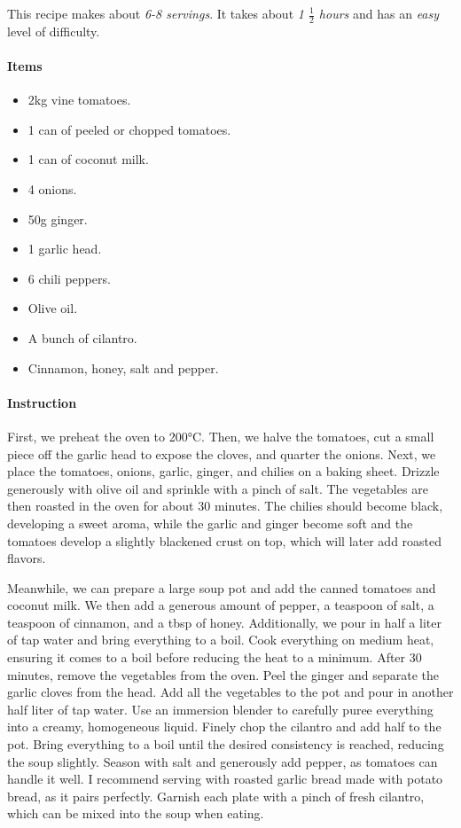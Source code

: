 This recipe makes about \emph{6-8 servings}. It takes about \emph{1 $\frac{1}{2}$ hours} and has an \emph{easy} level of difficulty. 

\paragraph{Items}
\begin{itemize}[noitemsep]
	\item[\ding{182}] 2kg vine tomatoes.
	\item[\ding{183}] 1 can of peeled or chopped tomatoes.
	\item[\ding{184}] 1 can of coconut milk.
	\item[\ding{185}] 4 onions.
	\item[\ding{186}] 50g ginger.
	\item[\ding{187}] 1 garlic head.
	\item[\ding{188}] 6 chili peppers.
	\item[\ding{189}] Olive oil.
	\item[\ding{190}] A bunch of cilantro.
	\item[\ding{191}] Cinnamon, honey, salt and pepper.
\end{itemize}

\paragraph{Instruction} First, we preheat the oven to 200°C. Then, we halve the tomatoes, cut a small piece off the garlic head to expose the cloves, and quarter the onions. Next, we place the tomatoes, onions, garlic, ginger, and chilies on a baking sheet. Drizzle generously with olive oil and sprinkle with a pinch of salt. The vegetables are then roasted in the oven for about 30 minutes. The chilies should become black, developing a sweet aroma, while the garlic and ginger become soft and the tomatoes develop a slightly blackened crust on top, which will later add roasted flavors.

Meanwhile, we can prepare a large soup pot and add the canned tomatoes and coconut milk. We then add a generous amount of pepper, a teaspoon of salt, a teaspoon of cinnamon, and a tbsp of honey. Additionally, we pour in half a liter of tap water and bring everything to a boil. Cook everything on medium heat, ensuring it comes to a boil before reducing the heat to a minimum. After 30 minutes, remove the vegetables from the oven. Peel the ginger and separate the garlic cloves from the head. Add all the vegetables to the pot and pour in another half liter of tap water. Use an immersion blender to carefully puree everything into a creamy, homogeneous liquid. Finely chop the cilantro and add half to the pot. Bring everything to a boil until the desired consistency is reached, reducing the soup slightly. Season with salt and generously add pepper, as tomatoes can handle it well. I recommend serving with roasted garlic bread made with potato bread, as it pairs perfectly. Garnish each plate with a pinch of fresh cilantro, which can be mixed into the soup when eating.
\clearpage